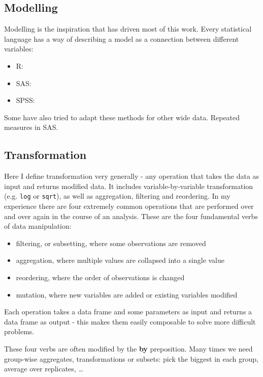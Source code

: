 \documentclass[oneside]{article}
\begin{document}
\subsection{Modelling}


Modelling is the inspiration that has driven most of this work. Every statistical language has a way of describing a model as a connection between different variables:

\begin{itemize}

\item R:
\item SAS:
\item SPSS:
\end{itemize}

Some have also tried to adapt these methods for other wide data. Repeated measures in SAS.

\subsection{Transformation}

Here I define transformation very generally - any operation that takes the data as input and returns modified data. It includes variable-by-variable transformation (e.g. \texttt{log} or \texttt{sqrt}), as well as aggregation, filtering and reordering. In my experience there are four extremely common operations that are performed over and over again in the course of an analysis.  These are the four fundamental verbs of data manipulation:

\begin{itemize}

\item filtering, or subsetting, where some observations are removed
\item aggregation, where multiple values are collapsed into a single value
\item reordering, where the order of observations is changed
\item mutation, where new variables are added or existing variables modified 
\end{itemize}

Each operation takes a data frame and some parameters as input and returns a data frame as output - this makes them easily composable to solve more difficult problems.  

These four verbs are often modified by the \textbf{by} preposition. Many times we need group-wise aggregates, transformations or subsets: pick the biggest in each group, average over replicates, \ldots
\end{document}
